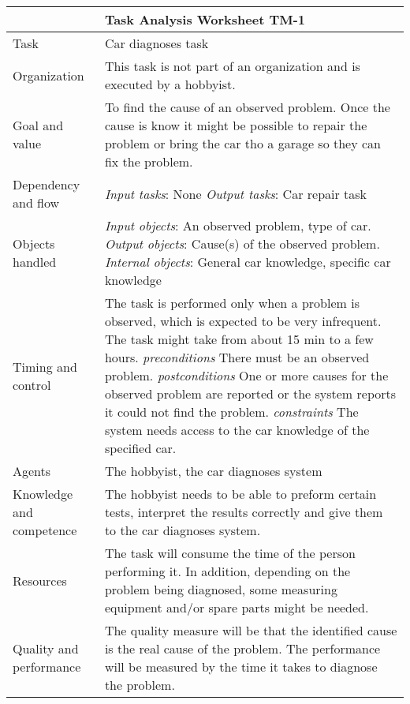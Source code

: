 \noindent
\begin{tabular} {|>{\colleft}p{2.5cm}|>{\colleft}p{9cm}|} \hline
{\bf Task Model} 			& 	{\bf Task Analysis Worksheet TM-1} 											\\ \hline \hline
\sc Task 				& 	Car diagnoses task													\\ \hline
\sc Organization 			& 	This task is not part of an organization and is executed by a hobbyist.					\\ \hline
\sc Goal and value 		& 	To find the cause of an observed problem. Once the cause is know it might 
						be possible to repair the problem or bring the car tho a garage so they can fix the problem.	\\ \hline
\sc Dependency and flow 	&	{\em Input tasks}: None													\newline
   						{\em Output tasks}: Car repair task 										\\ \hline
\sc Objects handled 		&	{\em Input objects}: An observed problem, type of car.							\newline
   						{\em Output objects}: Cause(s) of the observed problem.							\newline
   						{\em Internal objects}: General car knowledge, specific car knowledge					\\ \hline
\sc Timing and control		& 	The task is performed only when a problem is observed, which is expected to be very infrequent.
						The task might take from about 15 min to a few hours. 							\newline
						{\em preconditions} There must be an observed problem. 							\newline
						{\em postconditions} One or more causes for the observed problem are reported or the system 
						reports it could not find the problem.										\newline
						{\em constraints} The system needs access to the car knowledge of the specified car.		\\ \hline
\sc Agents 				&	The hobbyist, the car diagnoses system										\\ \hline
\sc Knowledge and competence 	& 	The hobbyist needs to be able to preform certain tests, interpret the results correctly and give
						them to the car diagnoses system. 											\\ \hline
\sc Resources 			& 	The task will consume the time of the person performing it. In addition, depending on the 
						problem being diagnosed, some measuring equipment and/or spare parts might be needed. 		\\ \hline
\sc Quality and performance 	& 	The quality measure will be that the identified cause is the real cause of the problem. The 
						performance will be measured by the time it takes to diagnose the problem.				\\ \hline
\end{tabular}

